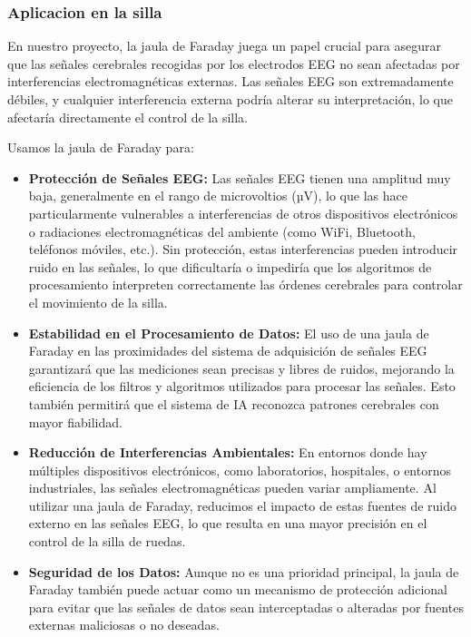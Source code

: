 \documentclass{article}
\begin{document}
\subsubsection{Aplicacion en la silla}
En nuestro proyecto, la jaula de Faraday juega un papel crucial para asegurar que las señales cerebrales recogidas por los electrodos EEG no sean afectadas por interferencias electromagnéticas externas. Las señales EEG son extremadamente débiles, y cualquier interferencia externa podría alterar su interpretación, lo que afectaría directamente el control de la silla. 

Usamos la jaula de Faraday para:
\begin{itemize}
    \item \textbf{Protección de Señales EEG:} Las señales EEG tienen una amplitud muy baja, generalmente en el rango de microvoltios (µV), lo que las hace particularmente vulnerables a interferencias de otros dispositivos electrónicos o radiaciones electromagnéticas del ambiente (como WiFi, Bluetooth, teléfonos móviles, etc.). Sin protección, estas interferencias pueden introducir ruido en las señales, lo que dificultaría o impediría que los algoritmos de procesamiento interpreten correctamente las órdenes cerebrales para controlar el movimiento de la silla.
    \item \textbf{Estabilidad en el Procesamiento de Datos:} El uso de una jaula de Faraday en las proximidades del sistema de adquisición de señales EEG garantizará que las mediciones sean precisas y libres de ruidos, mejorando la eficiencia de los filtros y algoritmos utilizados para procesar las señales. Esto también permitirá que el sistema de IA reconozca patrones cerebrales con mayor fiabilidad.
    \item \textbf{Reducción de Interferencias Ambientales:} En entornos donde hay múltiples dispositivos electrónicos, como laboratorios, hospitales, o entornos industriales, las señales electromagnéticas pueden variar ampliamente. Al utilizar una jaula de Faraday, reducimos el impacto de estas fuentes de ruido externo en las señales EEG, lo que resulta en una mayor precisión en el control de la silla de ruedas.
    \item \textbf{Seguridad de los Datos:} Aunque no es una prioridad principal, la jaula de Faraday también puede actuar como un mecanismo de protección adicional para evitar que las señales de datos sean interceptadas o alteradas por fuentes externas maliciosas o no deseadas.
\end{itemize}
\end{document}
